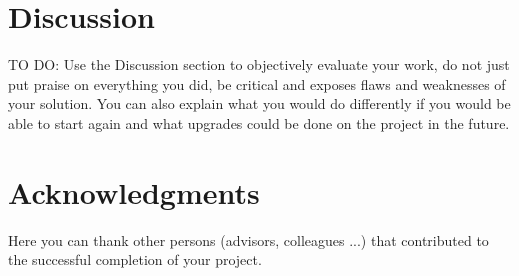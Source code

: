 \documentclass[fleqn,moreauthors,10pt]{ds_report}
\begin{document}






\section*{Discussion}

TO DO:
Use the Discussion section to objectively evaluate your work, do not just put praise on everything you did, be critical and exposes flaws and weaknesses of your solution. You can also explain what you would do differently if you would be able to start again and what upgrades could be done on the project in the future.






\section*{Acknowledgments}

Here you can thank other persons (advisors, colleagues ...) that contributed to the successful completion of your project.




\end{document}
